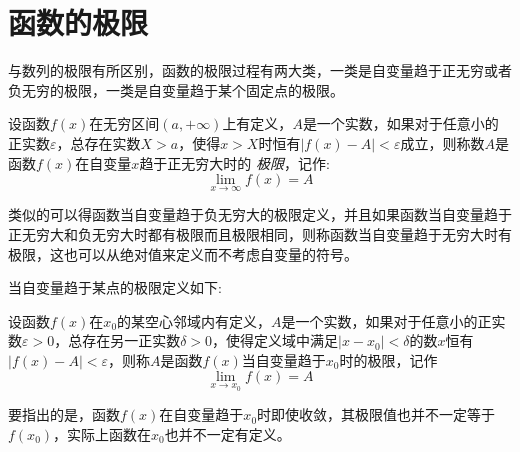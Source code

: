 
\section{函数的极限}
\label{sec:the-limit-concept-of-function}

与数列的极限有所区别，函数的极限过程有两大类，一类是自变量趋于正无穷或者负无穷的极限，一类是自变量趋于某个固定点的极限。

\begin{definition}
  设函数$f(x)$在无穷区间$(a,+\infty)$上有定义，$A$是一个实数，如果对于任意小的正实数$\varepsilon$，总存在实数$X>a$，使得$x>X$时恒有$|f(x)-A|<\varepsilon$成立，则称数$A$是函数$f(x)$在自变量$x$趋于正无穷大时的 \emph{极限}，记作:
  \[ \lim_{x\to\infty}f(x) = A \]
\end{definition}
类似的可以得函数当自变量趋于负无穷大的极限定义，并且如果函数当自变量趋于正无穷大和负无穷大时都有极限而且极限相同，则称函数当自变量趋于无穷大时有极限，这也可以从绝对值来定义而不考虑自变量的符号。

当自变量趋于某点的极限定义如下:
\begin{definition}
  设函数$f(x)$在$x_0$的某空心邻域内有定义，$A$是一个实数，如果对于任意小的正实数$\varepsilon>0$，总存在另一正实数$\delta>0$，使得定义域中满足$|x-x_0|<\delta$的数$x$恒有$|f(x)-A|<\varepsilon$，则称$A$是函数$f(x)$当自变量趋于$x_0$时的极限，记作
  \[ \lim_{x\to x_0} f(x) = A \]
\end{definition}
要指出的是，函数$f(x)$在自变量趋于$x_0$时即使收敛，其极限值也并不一定等于$f(x_0)$，实际上函数在$x_0$也并不一定有定义。

